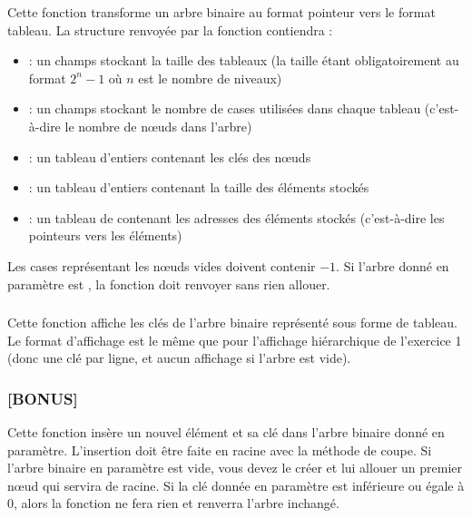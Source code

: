 \noindent Cette fonction transforme un arbre binaire au format pointeur vers le format tableau.
La structure  renvoyée par la fonction contiendra :
\begin{itemize}
\item {} : un champs stockant la taille des tableaux (la taille étant obligatoirement au format $ 2^{n} - 1 $ où $ n $ est le nombre de niveaux)
\item {} : un champs stockant le nombre de cases utilisées dans chaque tableau (c'est-à-dire le nombre de nœuds dans l'arbre)
\item {} : un tableau d'entiers contenant les clés des nœuds
\item {} : un tableau d'entiers contenant la taille des éléments stockés
\item {} : un tableau de  contenant les adresses des éléments stockés (c'est-à-dire les pointeurs vers les éléments)
\end{itemize}
Les cases représentant les nœuds vides doivent contenir $ -1 $.
Si l'arbre donné en paramètre est , la fonction doit renvoyer  sans rien allouer.

\medskip


\subsubsection*{}

\noindent Cette fonction affiche les clés de l'arbre binaire représenté sous forme de tableau.
Le format d'affichage est le même que pour l'affichage hiérarchique de l'exercice 1 (donc une clé par ligne, et aucun affichage si l'arbre est vide).

\medskip


\subsubsection*{\textbf{[BONUS] }}

\noindent Cette fonction insère un nouvel élément et sa clé dans l'arbre binaire donné en paramètre.
L'insertion doit être faite en racine avec la méthode de coupe.
Si l'arbre binaire en paramètre est vide, vous devez le créer et lui allouer un premier nœud qui servira de racine.
Si la clé donnée en paramètre est inférieure ou égale à $ 0 $, alors la fonction ne fera rien et renverra l'arbre inchangé.

